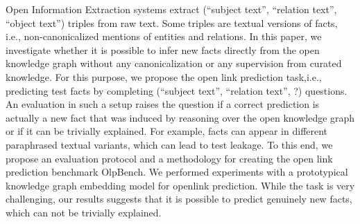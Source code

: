 Open Information Extraction systems extract (``subject text'', ``relation text'', ``object text'') triples from raw text. Some triples are textual versions of facts, i.e., non-canonicalized mentions of entities and relations. In this paper, we investigate whether it is possible to infer new facts directly from the open knowledge graph without any canonicalization or any supervision from curated knowledge. For this purpose, we propose the open link prediction task,i.e., predicting test facts by completing (``subject text'', ``relation text'', ?) questions. An evaluation in such a setup raises the question if a correct prediction is actually a new fact that was induced by reasoning over the open knowledge graph or if it can be trivially explained. For example, facts can appear in different paraphrased textual variants, which can lead to test leakage. To this end, we propose an evaluation protocol and a methodology for creating the open link prediction benchmark OlpBench. We performed experiments with a prototypical knowledge graph embedding model for openlink prediction. While the task is very challenging, our results suggests that it is possible to predict genuinely new facts, which can not be trivially explained.
